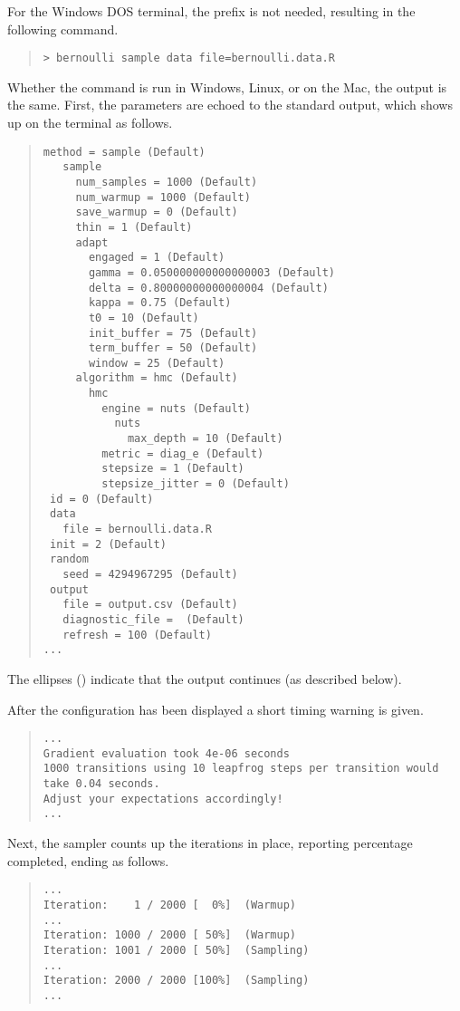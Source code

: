 For the Windows DOS terminal, the  prefix is not needed,
resulting in the following command.
%
\begin{quote}
\begin{Verbatim}[fontshape=sl]
> bernoulli sample data file=bernoulli.data.R
\end{Verbatim}
\end{quote}
%
Whether the command is run in Windows, Linux, or on the Mac, the
output is the same.  First, the parameters are echoed to the standard output,
which shows up on the terminal as follows.
%
\begin{quote}
\begin{Verbatim}[fontsize=\small]
 method = sample (Default)
   sample
     num_samples = 1000 (Default)
     num_warmup = 1000 (Default)
     save_warmup = 0 (Default)
     thin = 1 (Default)
     adapt
       engaged = 1 (Default)
       gamma = 0.050000000000000003 (Default)
       delta = 0.80000000000000004 (Default)
       kappa = 0.75 (Default)
       t0 = 10 (Default)
       init_buffer = 75 (Default)
       term_buffer = 50 (Default)
       window = 25 (Default)
     algorithm = hmc (Default)
       hmc
         engine = nuts (Default)
           nuts
             max_depth = 10 (Default)
         metric = diag_e (Default)
         stepsize = 1 (Default)
         stepsize_jitter = 0 (Default)
 id = 0 (Default)
 data
   file = bernoulli.data.R
 init = 2 (Default)
 random
   seed = 4294967295 (Default)
 output
   file = output.csv (Default)
   diagnostic_file =  (Default)
   refresh = 100 (Default)
...
\end{Verbatim}
\end{quote}
%
The ellipses () indicate that the output continues (as
described below).

After the configuration has been displayed a short timing warning
is given.
%
\begin{quote}
\begin{Verbatim}[fontsize=\small]
...
Gradient evaluation took 4e-06 seconds
1000 transitions using 10 leapfrog steps per transition would take 0.04 seconds.
Adjust your expectations accordingly!
...
\end{Verbatim}
\end{quote}

Next, the sampler counts up the iterations in place, reporting
percentage completed, ending as follows.
%
\begin{quote}
\begin{Verbatim}[fontsize=\small]
...
Iteration:    1 / 2000 [  0%]  (Warmup)
...
Iteration: 1000 / 2000 [ 50%]  (Warmup)
Iteration: 1001 / 2000 [ 50%]  (Sampling)
...
Iteration: 2000 / 2000 [100%]  (Sampling)
...
\end{Verbatim}
\end{quote}

